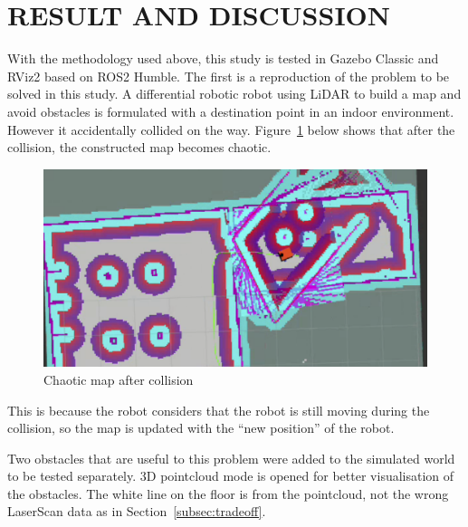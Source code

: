 \section{RESULT AND DISCUSSION}
\label{sec:result_and_discussion}
With the methodology used above, this study is tested in Gazebo Classic and RViz2 based on ROS2 Humble. 
The first is a reproduction of the problem to be solved in this study.
A differential robotic robot using LiDAR to build a map and avoid obstacles is formulated 
with a destination point in an indoor environment. However it accidentally collided on the way. 
Figure~\ref{fig:collision} below shows that after the collision, the constructed map becomes chaotic.
\begin{figure}[H]
    \centering
    \includegraphics[width=0.7\linewidth]{figs/chaotic_map.png}
    \caption{Chaotic map after collision}
    \label{fig:collision}
\end{figure}
This is because the robot considers that the robot is still moving during the collision,
so the map is updated with the ``new position'' of the robot.

Two obstacles that are useful to this problem were added to the simulated world to be tested separately.
3D pointcloud mode is opened for better visualisation of the obstacles. 
The white line on the floor is from the pointcloud, not the wrong LaserScan data as in Section~\ref{subsec:tradeoff}.


